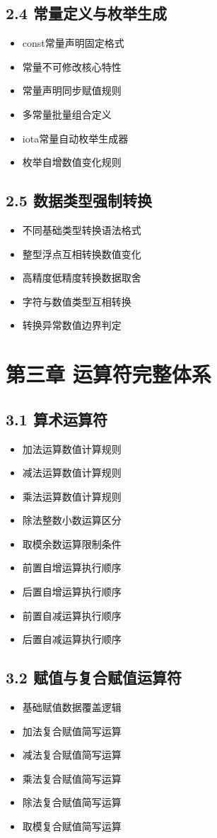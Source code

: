 \subsection{2.4 常量定义与枚举生成}
\begin{itemize}
\item const常量声明固定格式
\item 常量不可修改核心特性
\item 常量声明同步赋值规则
\item 多常量批量组合定义
\item iota常量自动枚举生成器
\item 枚举自增数值变化规则
\end{itemize}

\subsection{2.5 数据类型强制转换}
\begin{itemize}
\item 不同基础类型转换语法格式
\item 整型浮点互相转换数值变化
\item 高精度低精度转换数据取舍
\item 字符与数值类型互相转换
\item 转换异常数值边界判定
\end{itemize}

\section{第三章 运算符完整体系}
\subsection{3.1 算术运算符}
\begin{itemize}
\item 加法运算数值计算规则
\item 减法运算数值计算规则
\item 乘法运算数值计算规则
\item 除法整数小数运算区分
\item 取模余数运算限制条件
\item 前置自增运算执行顺序
\item 后置自增运算执行顺序
\item 前置自减运算执行顺序
\item 后置自减运算执行顺序
\end{itemize}

\subsection{3.2 赋值与复合赋值运算符}
\begin{itemize}
\item 基础赋值数据覆盖逻辑
\item 加法复合赋值简写运算
\item 减法复合赋值简写运算
\item 乘法复合赋值简写运算
\item 除法复合赋值简写运算
\item 取模复合赋值简写运算
\end{itemize}

